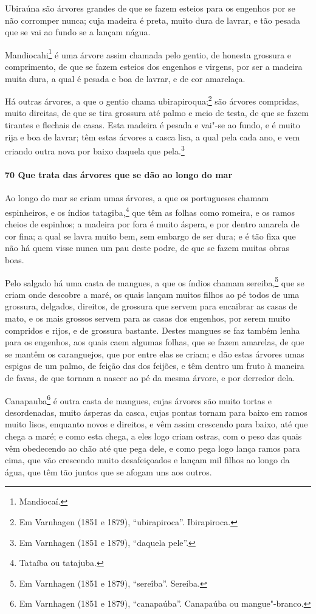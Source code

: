 \begin{linenumbers}
Ubiraúna são árvores grandes de que se fazem esteios para os engenhos por se não corromper
nunca; cuja madeira é preta, muito dura de lavrar, e tão pesada que se vai ao fundo se a
lançam nágua.

Mandiocahi\footnote{ Mandiocaí.} é uma árvore assim chamada pelo gentio, de honesta
grossura e comprimento, de que se fazem esteios dos engenhos e virgens, por ser a madeira
muita dura, a qual é pesada e boa de lavrar, e de cor amarelaça.


Há outras árvores, a que o gentio chama ubirapiroqua;\footnote{ Em Varnhagen (1851 e
1879), ``ubirapiroca''. Ibirapiroca.} são árvores compridas, muito direitas, de que se
tira grossura até palmo e meio de testa, de que se fazem tirantes e flechais de casas.
Esta madeira é pesada e vai"-se ao fundo, e é muito rija e boa de lavrar; têm estas árvores
a casca lisa, a qual pela cada ano, e vem criando outra nova por baixo daquela que
pela.\footnote{ Em Varnhagen (1851 e 1879), ``daquela pele''.}

\paragraph{70 Que trata das árvores que se dão ao longo do mar}\quad
Ao longo do mar se criam umas árvores, a que os portugueses chamam espinheiros, e os
índios tatagiba,\footnote{ Tataíba ou tatajuba.} que têm as folhas como romeira, e os
ramos cheios de espinhos; a madeira por fora é muito áspera, e por dentro amarela de cor
fina; a qual se lavra muito bem, sem embargo de ser dura; e é tão fixa que não há quem
visse nunca um pau deste podre, de que se fazem muitas obras boas.

Pelo salgado há uma casta de mangues, a que os índios chamam sereiba,\footnote{ Em
Varnhagen (1851 e 1879), ``sereîba''. Sereíba.} que se criam onde descobre a maré, os
quais lançam muitos filhos ao pé todos de uma grossura, delgados, direitos, de grossura
que servem para encaibrar as casas de mato, e os mais grossos servem para as casas dos
engenhos, por serem muito compridos e rijos, e de grossura bastante. Destes mangues se faz
também lenha para os engenhos, aos quais caem algumas folhas, que se fazem amarelas, de
que se mantêm os caranguejos, que por entre elas se criam; e dão estas árvores umas
espigas de um palmo, de feição das dos feijões, e têm dentro um fruto à maneira de favas,
de que tornam a nascer ao pé da mesma árvore, e por derredor dela.

Canapauba\footnote{ Em Varnhagen (1851 e 1879), ``canapaúba''. Canapaúba ou
mangue"-branco.} é outra casta de mangues, cujas árvores são muito tortas e desordenadas,
muito ásperas da casca, cujas pontas tornam para baixo em ramos muito lisos, enquanto
novos e direitos, e vêm assim crescendo para baixo, até que chega a maré; e como esta
chega, a eles logo criam ostras, com o peso das quais vêm obedecendo ao chão até que pega
dele, e como pega logo lança ramos para cima, que vão crescendo muito desafeiçoados e
lançam mil filhos ao longo da água, que têm tão juntos que se afogam uns aos outros.


\end{linenumbers}
